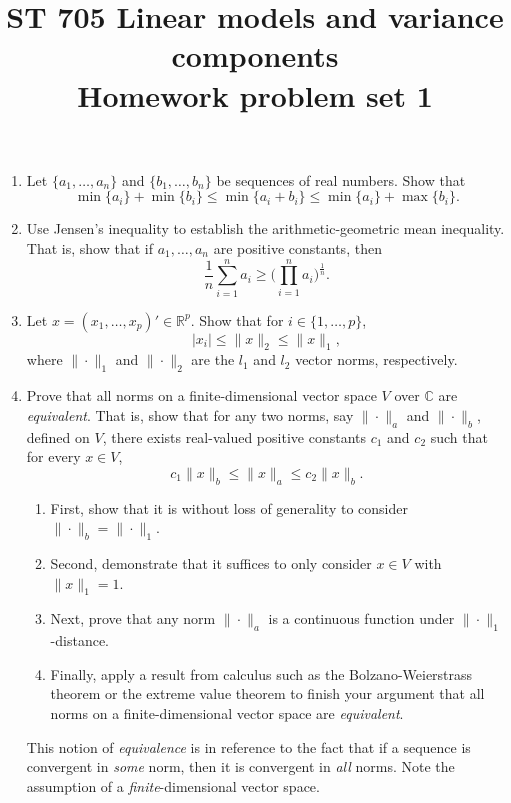 \documentclass[11pt]{article}
\title{ST 705 Linear models and variance components \\ 
        Homework problem set 1}
\begin{document}
\maketitle

\begin{enumerate}

\item Let $\{a_{1},\dots,a_{n}\}$ and $\{b_{1},\dots,b_{n}\}$ be sequences of real numbers.  Show that
\[
\min\{a_{i}\} + \min\{b_{i}\} \le \min\{a_{i} + b_{i}\} \le \min\{a_{i}\} + \max\{b_{i}\}.
\]

\item Use Jensen's inequality to establish the arithmetic-geometric mean inequality.  That is, show that if $a_{1},\dots,a_{n}$ are positive constants, then 
\[
\frac{1}{n}\sum_{i=1}^{n}a_{i} \ge \bigg(\prod_{i=1}^{n}a_{i}\bigg)^{\frac{1}{n}}.
\]

\item Let $x = (x_{1}, \dots, x_{p})' \in \mathbb{R}^{p}$.  Show that for $i \in \{1,\dots,p\}$,
\[
|x_{i}| \le \|x\|_{2} \le \|x\|_{1},
\]
where $\|\cdot\|_{1}$ and $\|\cdot\|_{2}$ are the $l_{1}$ and $l_{2}$ vector norms, respectively.

\item Prove that all norms on a finite-dimensional vector space $V$ over $\mathbb{C}$ are {\em equivalent}.  That is, show that for any two norms, say $\|\cdot\|_{a}$ and $\|\cdot\|_{b}$, defined on $V$, there exists real-valued positive constants $c_{1}$ and $c_{2}$ such that for every $x \in V$,
\[
c_{1}\|x\|_{b} \le \|x\|_{a} \le c_{2}\|x\|_{b}.
\]
\begin{enumerate}
\item First, show that it is without loss of generality to consider $\|\cdot\|_{b} = \|\cdot\|_{1}$.
\item Second, demonstrate that it suffices to only consider $x \in V$ with $\|x\|_{1} = 1$.
\item Next, prove that any norm $\|\cdot\|_{a}$ is a continuous function under $\|\cdot\|_{1}$-distance.
\item Finally, apply a result from calculus such as the Bolzano-Weierstrass theorem or the extreme value theorem to finish your argument that all norms on a finite-dimensional vector space are {\em equivalent}.
\end{enumerate}
This notion of {\em equivalence} is in reference to the fact that if a sequence is convergent in {\em some} norm, then it is convergent in {\em all} norms.  Note the assumption of a {\em finite}-dimensional vector space.


\end{enumerate}
\end{document}
